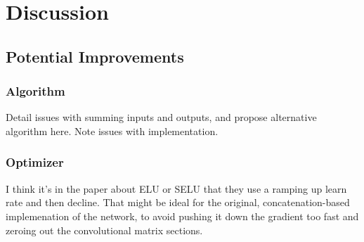 \chapter{Discussion}

\section{Potential Improvements}

\subsection{Algorithm}
Detail issues with summing inputs and outputs, and propose alternative algorithm 
here. Note issues with implementation.

\subsection{Optimizer}
I think it's in the paper about ELU or SELU that they use a ramping up learn 
rate and then decline. That might be ideal for the original, concatenation-based 
implemenation of the network, to avoid pushing it down the gradient too fast and 
zeroing out the convolutional matrix sections.
